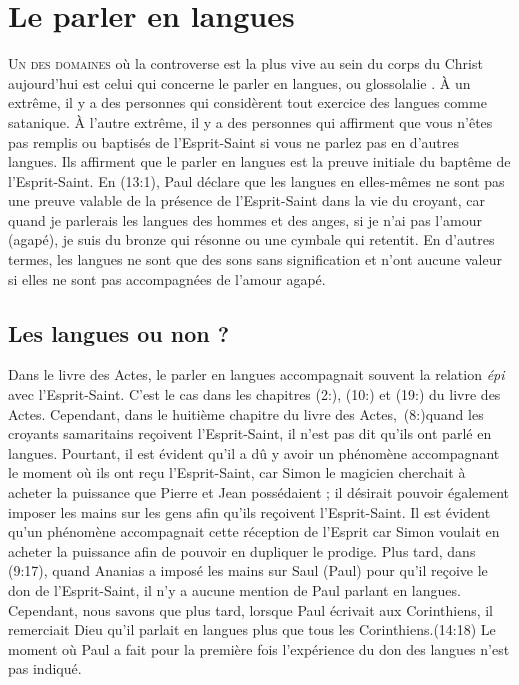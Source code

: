 \chapter{Le parler en langues}

\lettrine{U}{n des domaines} où la controverse est la plus vive au sein
 du corps du Christ aujourd'hui est celui qui concerne le parler en
 langues, ou \Og glossolalie \Fg{}.
 À un extrême, il y a des personnes qui considèrent tout exercice
 des langues comme satanique.
 À l'autre extrême, il y a des personnes qui affirment que vous n'êtes pas
 remplis ou baptisés de l'Esprit-Saint si vous ne parlez pas
 en d'autres langues. Ils affirment que le parler en langues
 est la preuve initiale du baptême de l'Esprit-Saint.
 En (13:1), Paul déclare que les langues en elles-mêmes
 ne sont pas une preuve valable de la présence de l'Esprit-Saint dans la vie
 du croyant, car \Og quand je parlerais les langues des hommes et des anges,
 si je n'ai pas l'amour (agapé), je suis du bronze qui résonne ou une cymbale
 qui retentit. \Fg{}
 En d'autres termes, les langues ne sont que des sons sans signification
 et n'ont aucune valeur si elles ne sont pas accompagnées de l'amour agapé.


\section{Les langues ou non ?}

Dans le livre des Actes, le parler en langues accompagnait souvent
 la relation \emph{épi} avec l'Esprit-Saint.
 C'est le cas dans les chapitres (2:), (10:)
 et (19:) du livre des Actes. Cependant, dans le huitième chapitre
 du livre des Actes,~(8:)quand les croyants samaritains reçoivent
 l'Esprit-Saint, il n'est pas dit qu'ils ont parlé en langues.
 Pourtant, il est évident qu'il a dû y avoir un phénomène accompagnant 
 le moment où ils ont reçu l'Esprit-Saint, car Simon le magicien cherchait
 à acheter la puissance que Pierre et Jean possédaient ;
 il désirait pouvoir également imposer les mains sur les gens
 afin qu'ils reçoivent l'Esprit-Saint. Il est évident qu'un phénomène
 accompagnait cette réception de l'Esprit car Simon voulait en acheter
 la puissance afin de pouvoir en dupliquer le prodige.
 Plus tard, dans (9:17), quand Ananias a imposé les mains
 sur Saul (Paul) pour qu'il reçoive le don de l'Esprit-Saint,
 il n'y a aucune mention de Paul parlant en langues.
 Cependant, nous savons que plus tard, lorsque Paul écrivait aux
 Corinthiens, il remerciait Dieu qu'il parlait en langues plus que tous
 les Corinthiens.(14:18)
 Le moment où Paul a fait pour la première fois
 l'expérience  du don
 des langues  n'est pas indiqué.

